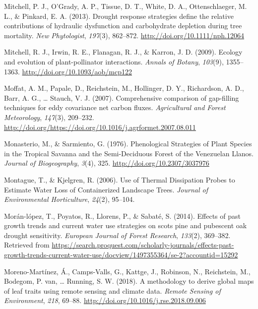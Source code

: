 \documentclass[11pt,twoside]{reedthesis}
\begin{document}
\hypertarget{ref-mitchell_drought_2013}{}
Mitchell, P. J., O'Grady, A. P., Tissue, D. T., White, D. A.,
Ottenschlaeger, M. L., \& Pinkard, E. A. (2013). Drought response
strategies define the relative contributions of hydraulic dysfunction
and carbohydrate depletion during tree mortality. \emph{New
Phytologist}, \emph{197}(3), 862--872.
\url{http://doi.org/10.1111/nph.12064}

\hypertarget{ref-Mitchell2009}{}
Mitchell, R. J., Irwin, R. E., Flanagan, R. J., \& Karron, J. D. (2009).
Ecology and evolution of plant-pollinator interactions. \emph{Annals of
Botany}, \emph{103}(9), 1355--1363.
\url{http://doi.org/10.1093/aob/mcp122}

\hypertarget{ref-Moffat2007}{}
Moffat, A. M., Papale, D., Reichstein, M., Hollinger, D. Y., Richardson,
A. D., Barr, A. G., \ldots{} Stauch, V. J. (2007). Comprehensive
comparison of gap-filling techniques for eddy covariance net carbon
fluxes. \emph{Agricultural and Forest Meteorology}, \emph{147}(3),
209--232.
\url{http://doi.org/https://doi.org/10.1016/j.agrformet.2007.08.011}

\hypertarget{ref-monasterio_phenological_1976}{}
Monasterio, M., \& Sarmiento, G. (1976). Phenological Strategies of
Plant Species in the Tropical Savanna and the Semi-Deciduous Forest of
the Venezuelan Llanos. \emph{Journal of Biogeography}, \emph{3}(4), 325.
\url{http://doi.org/10.2307/3037976}

\hypertarget{ref-Montague2006}{}
Montague, T., \& Kjelgren, R. (2006). Use of Thermal Dissipation Probes
to Estimate Water Loss of Containerized Landscape Trees. \emph{Journal
of Environmental Horticulture}, \emph{24}(2), 95--104.

\hypertarget{ref-moranlopez2014}{}
Morán-lópez, T., Poyatos, R., Llorens, P., \& Sabaté, S. (2014). Effects
of past growth trends and current water use strategies on scots pine and
pubescent oak drought sensitivity. \emph{European Journal of Forest
Research}, \emph{133}(2), 369--382. Retrieved from
\url{https://search.proquest.com/scholarly-journals/effects-past-growth-trends-current-water-use/docview/1497355364/se-2?accountid=15292}

\hypertarget{ref-moreno-martinez_methodology_2018}{}
Moreno-Martínez, Á., Camps-Valls, G., Kattge, J., Robinson, N.,
Reichstein, M., Bodegom, P. van, \ldots{} Running, S. W. (2018). A
methodology to derive global maps of leaf traits using remote sensing
and climate data. \emph{Remote Sensing of Environment}, \emph{218},
69--88. \url{http://doi.org/10.1016/j.rse.2018.09.006}
\end{document}
